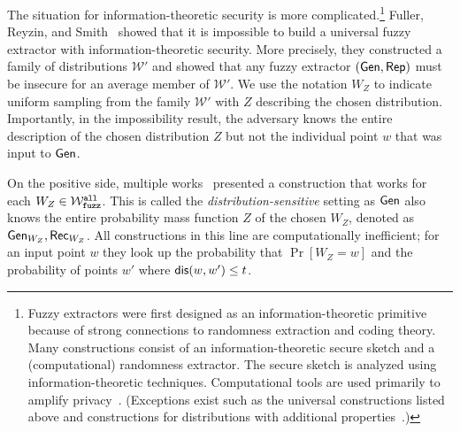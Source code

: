 The situation for information-theoretic security is more complicated.\footnote{Fuzzy extractors were first designed as an information-theoretic primitive because of strong connections to randomness extraction and coding theory.  Many constructions consist of an information-theoretic secure sketch and a (computational) randomness extractor.  The secure sketch is analyzed using information-theoretic techniques.  Computational tools are used primarily to amplify privacy~\cite{wen2018robustly,wen2019generic}.  (Exceptions exist such as the universal constructions listed above and constructions for distributions with additional properties~\cite{apon2017efficient,alamelou2018pseudoentropic,fuller2020computational,canetti2021reusable}.)
}  Fuller, Reyzin, and Smith~\cite{fuller2020fuzzy} showed that it is impossible to build a universal fuzzy extractor with information-theoretic security.  More precisely, they constructed a family of distributions $\mathcal{W}'$ and showed that any fuzzy extractor $({\mathsf{Gen}}, {\mathsf{Rep}})$ must be insecure for an average member of $\mathcal{W}'$. We use the notation $W_Z$ to indicate uniform sampling from the family $\mathcal{W}'$ with $Z$ describing the chosen distribution.  Importantly, in the impossibility result, the adversary knows the entire description of the chosen distribution $Z$ but not the individual point $w$ that was input to ${\mathsf{Gen}}$.

On the positive side, multiple works~\cite{hayashi2014secret,hayashi2016secret,fuller2016fuzzy,woodage2017new,tyagi2017universal,TVW18,LA18,fuller2019continuous,fuller2020fuzzy} presented a construction that works for each $W_Z\in \mathcal{W}_{\mathtt{fuzz}}^{\mathtt{all}}$.  This is called the \emph{distribution-sensitive} setting as ${\mathsf{Gen}}$ also knows the entire probability mass function $Z$ of the chosen $W_Z$, denoted as ${\mathsf{Gen}}_{W_Z}, {\mathsf{Rec}}_{W_Z}$.  All constructions in this line are computationally inefficient; for an input point $w$ they look up the probability that $\Pr[W_Z=w]$ and the probability of points $w'$ where $\mathsf{dis}(w, w')\le t$.  

